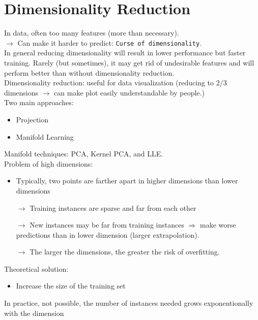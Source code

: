 \newpage
\section{Dimensionality Reduction}

In data, often too many features (more than necessary).\\
$\rightarrow$ Can make it harder to predict: \verb;Curse of dimensionality;.\\

In general reducing dimensionality will result in lower performance but faster training.
Rarely (but sometimes), it may get rid of undesirable features and will perform better than without dimensionality
reduction.\\

Dimensionality reduction: useful for data visualization (reducing to 2/3 dimensions $\rightarrow$ can make plot easily
understandable by people.)\\

Two main approaches:\\
\begin{itemize}
    \item Projection
    \item Manifold Learning
\end{itemize}

Manifold techniques: PCA, Kernel PCA, and LLE.\\

Problem of high dimensions:
\begin{itemize}
    \item Typically, two points are farther apart in higher dimensions than lower dimensions
    \item[$\rightarrow$] Training instances are sparse and far from each other
    \item[$\rightarrow$] New instances may be far from training instances $\Rightarrow$ make worse predictions than in
        lower dimension (larger extrapolation).
    \item[$\rightarrow$] The larger the dimensions, the greater the risk of overfitting.
\end{itemize}

Theoretical solution:
\begin{itemize}
    \item Increase the size of the training set
\end{itemize}
In practice, not possible, the number of instances needed grows exponentionally with the dimension


